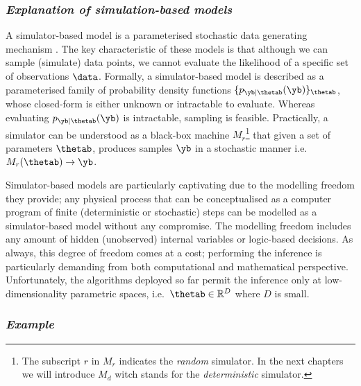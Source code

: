 \subsubsection*{\textit{Explanation of simulation-based models}}

A simulator-based model is a parameterised stochastic data generating
mechanism \cite{Gutmann2016}. The key characteristic of these
models is that although we can sample (simulate) data points, we
cannot evaluate the likelihood of a specific set of observations
$\data$. Formally, a simulator-based model is described as a
parameterised family of probability density functions
$\{ p_{\yb|\thetab}(\yb) \}_{\thetab}$, whose closed-form is either
unknown or intractable to evaluate. Whereas evaluating
$p_{\yb|\thetab}(\yb)$ is intractable, sampling is
feasible. Practically, a simulator can be understood as a black-box
machine $M_r$\footnote{The subscript $r$ in $M_r$ indicates the
  \textit{random} simulator. In the next chapters we will introduce
  $M_d$ witch stands for the \textit{deterministic} simulator.} that
given a set of parameters $\thetab$, produces samples $\yb$ in a
stochastic manner i.e.\ $M_r(\thetab) \rightarrow \yb$.

Simulator-based models are particularly captivating due to the
modelling freedom they provide; any physical process that can be
conceptualised as a computer program of finite (deterministic or
stochastic) steps can be modelled as a simulator-based model without
any compromise. The modelling freedom includes any amount of hidden
(unobserved) internal variables or logic-based decisions. As always,
this degree of freedom comes at a cost; performing the inference is
particularly demanding from both computational and mathematical
perspective. Unfortunately, the algorithms deployed so far permit the
inference only at low-dimensionality parametric spaces, i.e.\
$\thetab \in \mathbb{R}^D$ where $D$ is small.

\subsubsection*{\textit{Example}}

